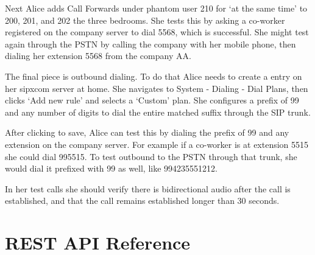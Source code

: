 \documentclass[letterpaper,10pt,english]{sphinxmanual}
\begin{document}
Next Alice adds Call Forwards under phantom user 210 for ‘at the same time’ to 200, 201, and 202 \textendash{} the three bedrooms.
She tests this by asking a co-worker registered on the company server to dial 5568, which is successful.
She might test again through the PSTN by calling the company with her mobile phone, then dialing her extension 5568 from the company AA.


The final piece is outbound dialing. To do that Alice needs to create a {\hyperref[\detokenize{webui:dial-plans}]{}} entry on her sipxcom server at home.
She navigates to System - Dialing - Dial Plans, then clicks ‘Add new rule’ and selects a ‘Custom’ plan.
She configures a prefix of 99 and any number of digits to dial the entire matched suffix through the SIP trunk.


After clicking  to save, Alice can test this by dialing the prefix of 99 and any extension on the company server. For example if a co-worker is at extension 5515 she could dial 995515.
To test outbound to the PSTN through that trunk, she would dial it prefixed with 99 as well, like 994235551212.

In her test calls she should verify there is bidirectional audio after the call is established, and that the call remains established longer than 30 seconds.

\ignorespaces 

\chapter{REST API Reference}
\label{\detokenize{restapi:rest-api-reference}}\label{\detokenize{restapi:index-0}}\label{\detokenize{restapi:id1}}\label{\detokenize{restapi::doc}}
\end{document}
